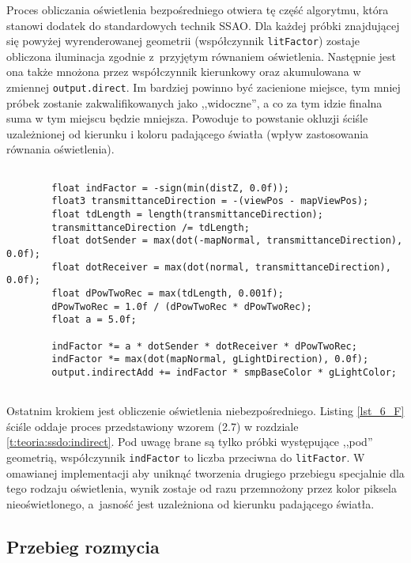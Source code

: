 		Proces obliczania oświetlenia bezpośredniego otwiera tę część algorytmu, która stanowi dodatek do standardowych technik SSAO. Dla każdej próbki znajdującej się powyżej wyrenderowanej geometrii (współczynnik \texttt{litFactor}) zostaje obliczona iluminacja zgodnie z~przyjętym równaniem oświetlenia. Następnie jest ona także mnożona przez współczynnik kierunkowy oraz akumulowana w zmiennej \texttt{output.direct}. Im bardziej powinno być zacienione miejsce, tym mniej próbek zostanie zakwalifikowanych jako ,,widoczne'', a co za tym idzie finalna suma w tym miejscu będzie mniejsza. Powoduje to powstanie okluzji ściśle uzależnionej od kierunku i koloru padającego światła (wpływ zastosowania równania oświetlenia).
		
		\begin{lstlisting}[language=HLSL,caption={Obliczenie oświetlenia pośredniego SSDO-A.},label={lst_6_F}]
		
		float indFactor = -sign(min(distZ, 0.0f));
		float3 transmittanceDirection = -(viewPos - mapViewPos);
		float tdLength = length(transmittanceDirection);
		transmittanceDirection /= tdLength;
		float dotSender = max(dot(-mapNormal, transmittanceDirection), 0.0f);
		float dotReceiver = max(dot(normal, transmittanceDirection), 0.0f);
		float dPowTwoRec = max(tdLength, 0.001f);
		dPowTwoRec = 1.0f / (dPowTwoRec * dPowTwoRec);
		float a = 5.0f;
		
		indFactor *= a * dotSender * dotReceiver * dPowTwoRec;
		indFactor *= max(dot(mapNormal, gLightDirection), 0.0f);
		output.indirectAdd += indFactor * smpBaseColor * gLightColor;
		
		\end{lstlisting}
		
		Ostatnim krokiem jest obliczenie oświetlenia niebezpośredniego. Listing \ref{lst_6_F} ściśle oddaje proces przedstawiony wzorem (2.7) w rozdziale \ref{t:teoria:ssdo:indirect}. Pod uwagę brane są tylko próbki występujące ,,pod'' geometrią, współczynnik \texttt{indFactor} to liczba przeciwna do \texttt{litFactor}. W omawianej implementacji aby uniknąć tworzenia drugiego przebiegu specjalnie dla tego rodzaju oświetlenia, wynik zostaje od razu przemnożony przez kolor piksela nieoświetlonego, a~jasność jest uzależniona od kierunku padającego światła.		\raggedbottom
	
	\subsection{Przebieg rozmycia}
	\label{t:impl:a:pass2}

